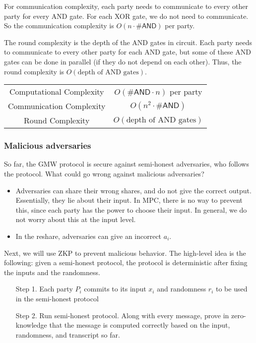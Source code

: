 For communication complexity, each party needs to communicate to every other party for every \textsf{AND} gate. For each XOR gate, we do not need to communicate. So the communication complexity is $O(n \cdot \#\mathsf{AND})$ per party.

The round complexity is the depth of the AND gates in circuit. Each party needs to communicate to every other party for each AND gate, but some of these AND gates can be done in parallel (if they do not depend on each other). Thus, the round complexity is $O(\text{depth of AND gates})$.

\begin{center}
\begin{tabular}{c|c} 
Computational Complexity & $O(\#\mathsf{AND}\cdot n)$ per party\\
Communication Complexity & $O(n^2\cdot \#\mathsf{AND})$\\
Round Complexity & $O(\text{depth of AND gates})$
\end{tabular}
\end{center}

\subsubsection{Malicious adversaries}

So far, the GMW protocol is secure against semi-honest adversaries, who follows the protocol. What could go wrong against malicious adversaries?

\begin{itemize}
    \item Adversaries can share their wrong shares, and do not give the correct output. Essentially, they lie about their input. In MPC, there is no way to prevent this, since each party has the power to choose their input. In general, we do not worry about this at the input level.
    \item In the reshare, adversaries can give an incorrect $a_i$.
\end{itemize}

Next, we will use ZKP to prevent malicious behavior. The high-level idea is the following: given a semi-honest protocol, the protocol is deterministic after fixing the inputs and the randomness.

\begin{itemize}
    \item[Step 1.] Each party $P_i$ commits to its input $x_i$ and randomness $r_i$ to be used in the semi-honest protocol
    \item[Step 2.] Run semi-honest protocol. Along with every message, prove in zero-knowledge that the message is computed correctly based on the input, randomness, and transcript so far.
\end{itemize}

